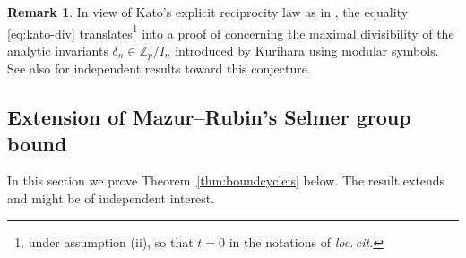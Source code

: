 \documentclass[10pt,reqno]{amsart}
\numberwithin{equation}{section}
\theoremstyle{plain}
\theoremstyle{definition}
\newtheorem{rem}[thm]{Remark}
\theoremstyle{definition}
\theoremstyle{plain}
\theoremstyle{plain}
\theoremstyle{plain}
\theoremstyle{plain}
\theoremstyle{plain}
\theoremstyle{plain}
\newcommand{\ind}{\operatorname{ind}}
\newcommand{\Z}{\mathbb{Z}}
\newcommand{\Q}{\mathbb{Q}}
\newcommand{\bkappa}{\boldsymbol{\kappa}}
\newcommand{\cN}{\mathcal{N}}
\begin{document}
\begin{rem} In view of 
Kato's explicit reciprocity law as in \cite[Thm.~3.11]{kim}, the equality \eqref{eq:kato-div} translates\footnote{under assumption (ii), so that $t=0$ in the notations of \emph{loc.\,cit.}} into a proof of \cite[Conj.~1.9]{kim} concerning the maximal divisibility of the analytic invariants 
$\delta_n\in\Z_p/I_n$  
introduced by Kurihara \cite{kur-Iw2012} using modular symbols. See also \cite{kurihara-sakamoto} for independent results toward this conjecture. 

%
\end{rem}
 

\subsection{Extension of Mazur--Rubin's Selmer group bound}
\label{subsec:MR-refined}

In this section we prove Theorem~\ref{thm:boundcycleis} below. 
The result extends \cite[Thm.\,5.2.2]{mazrub} and might be of independent interest. 
\end{document}
